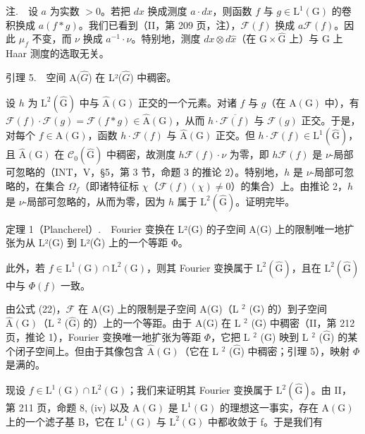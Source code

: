 注.　设 \(a\) 为实数 \(>0\)。若把 \(dx\) 换成测度 \(a \cdot dx\)，则函数 \(f\) 与 \(g \in \mathrm{L}^{1}(\mathrm{G})\) 的卷积换成 \(a(f*g)\)。我们已看到（II，第 209 页，注），\(\mathcal{F}(f)\) 换成 \(a\mathcal{F}(f)\)。因此 \(\mu_{f}\) 不变，而 \(\nu\) 换成 \(a^{-1} \cdot \nu\)。特别地，测度 \(dx \otimes d\hat{x}\)（在 \(\mathrm{G} \times \hat{\mathrm{G}}\) 上）与 \(\mathrm{G}\) 上 Haar 测度的选取无关。

引理 5.　空间 A(\(\hat{G}\)) 在 L²(\(\hat{G}\)) 中稠密。

设 \(h\) 为 \(\mathrm{L}^2(\widehat{\mathrm{G}})\) 中与 \(\widehat{\mathrm{A}}(\mathrm{G})\) 正交的一个元素。对诸 \(f\) 与 \(g\)（在 \(\mathrm{A}(\mathrm{G})\) 中），有 \(\mathcal{F}(f) \cdot \mathcal{F}(g) = \mathcal{F}(f*g) \in \widehat{\mathrm{A}}(\mathrm{G})\)，从而 \(h \cdot \overline{\mathcal{F}(f)}\) 与 \(\mathcal{F}(g)\) 正交。于是，对每个 \(f \in \mathrm{A}(\mathrm{G})\)，函数 \(h \cdot \mathcal{F}(f)\) 与 \(\widehat{\mathrm{A}}(\mathrm{G})\) 正交。但 \(h \cdot \mathcal{F}(f) \in \mathrm{L}^1(\widehat{\mathrm{G}})\)，且 \(\widehat{\mathrm{A}}(\mathrm{G})\) 在 \(\mathcal{C}_0(\widehat{\mathrm{G}})\) 中稠密，故测度 \(h\mathcal{F}(f) \cdot \nu\) 为零，即 \(h\mathcal{F}(f)\) 是 \(\nu\)-局部可忽略的（INT，V，§5，第 3 节，命题 3 的推论 2）。特别地，\(h\) 是 \(\nu\)-局部可忽略的，在集合 \(\Omega_f\)（即诸特征标 \(\chi\)（\(\mathcal{F}(f)(\chi) \neq 0\)）的集合）上。由推论 2，\(h\) 是 \(\nu\)-局部可忽略的，从而为零，因为 \(h\) 属于 \(\mathrm{L}^2(\widehat{\mathrm{G}})\)。证明完毕。

定理 1（Plancherel）.　Fourier 变换在 L²(G) 的子空间 A(G) 上的限制唯一地扩张为从 L²(G) 到 L²(Ĝ) 上的一个等距 Φ。

此外，若 \(f \in \mathrm{L}^{1}(\mathrm{G}) \cap \mathrm{L}^{2}(\mathrm{G})\)，则其 Fourier 变换属于 \(\mathrm{L}^{2}(\widehat{\mathrm{G}})\)，且在 \(\mathrm{L}^{2}(\widehat{\mathrm{G}})\) 中与 \(\Phi(f)\) 一致。

由公式 (22)，\(\mathcal{F}\) 在 A(G) 上的限制是子空间 A(G)（L \(^2\) (G) 的）到子空间 \(\hat{\mathrm{A}}(\mathrm{G})\)（L \(^2\) (\(\hat{\mathrm{G}}\)) 的）上的一个等距。由于 A(G) 在 L \(^2\) (G) 中稠密（II，第 212 页，推论 1），Fourier 变换唯一地扩张为等距 \(\Phi\)，它把 L \(^2\) (G) 映到 L \(^2\) (\(\hat{\mathrm{G}}\)) 的某个闭子空间上。但由于其像包含 \(\hat{\mathrm{A}}(\mathrm{G})\)（它在 L \(^2\) (\(\hat{\mathrm{G}}\)) 中稠密；引理 5），映射 \(\Phi\) 是满的。

现设 \(f \in \mathrm{L}^{1}(\mathrm{G}) \cap \mathrm{L}^{2}(\mathrm{G})\)；我们来证明其 Fourier 变换属于 \(\mathrm{L}^{2}(\widehat{\mathrm{G}})\)。由 II，第 211 页，命题 8, (iv) 以及 \(\mathrm{A}(\mathrm{G})\) 是 \(\mathrm{L}^{1}(\mathrm{G})\) 的理想这一事实，存在 \(\mathrm{A}(\mathrm{G})\) 上的一个滤子基 B，它在 \(\mathrm{L}^{1}(\mathrm{G})\) 与 \(\mathrm{L}^{2}(\mathrm{G})\) 中都收敛于 f。于是我们有

